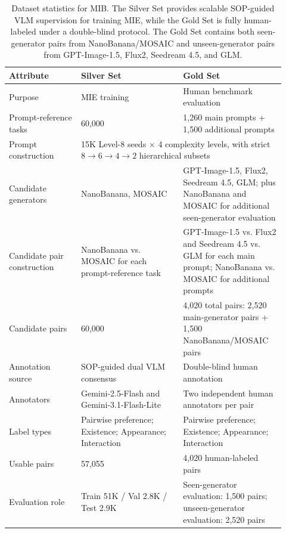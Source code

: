 \documentclass{article}
\begin{document}
\begin{table}[t]
\centering
\small
\begin{tabular}{p{0.24\linewidth}p{0.34\linewidth}p{0.34\linewidth}}
\toprule
\textbf{Attribute} & \textbf{Silver Set} & \textbf{Gold Set} \\
\midrule
Purpose 
& MIE training 
& Human benchmark evaluation \\

Prompt-reference tasks 
& 60,000 
& 1,260 main prompts + 1,500 additional prompts \\

Prompt construction 
& \multicolumn{2}{p{0.72\linewidth}}{15K Level-8 seeds $\times$ 4 complexity levels, with strict $8 \rightarrow 6 \rightarrow 4 \rightarrow 2$ hierarchical subsets} \\

Candidate generators 
& NanoBanana, MOSAIC 
& GPT-Image-1.5, Flux2, Seedream 4.5, GLM; plus NanoBanana and MOSAIC for additional seen-generator evaluation \\

Candidate pair construction 
& NanoBanana vs. MOSAIC for each prompt-reference task 
& GPT-Image-1.5 vs. Flux2 and Seedream 4.5 vs. GLM for each main prompt; NanoBanana vs. MOSAIC for additional prompts \\

Candidate pairs 
& 60,000 
& 4,020 total pairs: 2,520 main-generator pairs + 1,500 NanoBanana/MOSAIC pairs \\

Annotation source 
& SOP-guided dual VLM consensus 
& Double-blind human annotation \\

Annotators 
& Gemini-2.5-Flash and Gemini-3.1-Flash-Lite 
& Two independent human annotators per pair \\

Label types 
& Pairwise preference; Existence; Appearance; Interaction 
& Pairwise preference; Existence; Appearance; Interaction \\

Usable pairs 
& 57,055 
& 4,020 human-labeled pairs \\

Evaluation role 
& Train 51K / Val 2.8K / Test 2.9K 
& Seen-generator evaluation: 1,500 pairs; unseen-generator evaluation: 2,520 pairs \\
\bottomrule
\end{tabular}
\caption{Dataset statistics for MIB. The Silver Set provides scalable SOP-guided VLM supervision for training MIE, while the Gold Set is fully human-labeled under a double-blind protocol. The Gold Set contains both seen-generator pairs from NanoBanana/MOSAIC and unseen-generator pairs from GPT-Image-1.5, Flux2, Seedream 4.5, and GLM.}
\label{tab:dataset_statistics}
\end{table}
\end{document}
